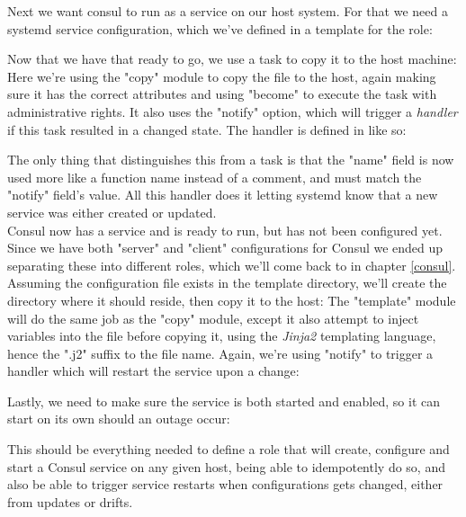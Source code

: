                 Next we want consul to run as a service on our host system. For that we need a systemd service configuration, which we've defined in a template for the role:
                
                Now that we have that ready to go, we use a task to copy it to the host machine:
                Here we're using the "copy" module to copy the file to the host, again making sure it has the correct attributes and using "become" to execute the task with administrative rights. It also uses the "notify" option, which will trigger a \textit{handler} if this task resulted in a changed state. The handler is defined in  like so:
                
                The only thing that distinguishes this from a task is that the "name" field is now used more like a function name instead of a comment, and must match the "notify" field's value. All this handler does it letting systemd know that a new service was either created or updated.\\
                
                Consul now has a service and is ready to run, but has not been configured yet. Since we have both "server" and "client" configurations for Consul we ended up separating these into different roles, which we'll come back to in chapter \ref{consul}. Assuming the configuration file exists in the template directory, we'll create the directory where it should reside, then copy it to the host:
                The "template" module will do the same job as the "copy" module, except it also attempt to inject variables into the file before copying it, using the \textit{Jinja2} templating language, hence the ".j2" suffix to the file name. Again, we're using "notify" to trigger a handler which will restart the service upon a change:
                
                Lastly, we need to make sure the service is both started and enabled, so it can start on its own should an outage occur:
                
                This should be everything needed to define a role that will create, configure and start a Consul service on any given host, being able to idempotently do so, and also be able to trigger service restarts when configurations gets changed, either from updates or drifts.\\
                
